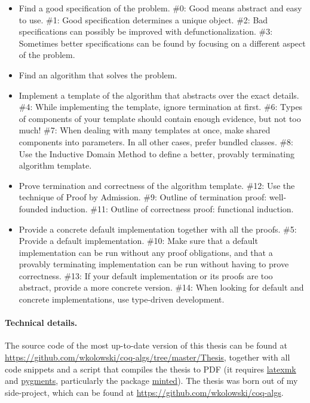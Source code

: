 \documentclass[declaration,mgr,english,shortabstract]{iithesis}
\newcommand{\repo}{\url{https://github.com/wkolowski/coq-algs}}
\newcommand{\thesisrepo}{\url{https://github.com/wkolowski/coq-algs/tree/master/Thesis}}
\begin{document}
\begin{itemize}
    \item Find a good specification of the problem.
    \subitem \#0: Good means abstract and easy to use.
    \subitem \#1: Good specification determines a unique object.
    \subitem \#2: Bad specifications can possibly be improved with defunctionalization.
    \subitem \#3: Sometimes better specifications can be found by focusing on a different aspect of the problem.
    \item Find an algorithm that solves the problem.
    \item Implement a template of the algorithm that abstracts over the exact details.
    \subitem \#4: While implementing the template, ignore termination at first.
    \subitem \#6: Types of components of your template should contain enough evidence, but not too much!
    \subitem \#7: When dealing with many templates at once, make shared components into parameters. In all other cases, prefer bundled classes.
    \subitem \#8: Use the Inductive Domain Method to define a better, provably terminating algorithm template.
    \item Prove termination and correctness of the algorithm template.
    \subitem \#12: Use the technique of Proof by Admission.
    \subitem \#9: Outline of termination proof: well-founded induction.
    \subitem \#11: Outline of correctness proof: functional induction.
    \item Provide a concrete default implementation together with all the proofs.
    \subitem \#5: Provide a default implementation.
    \subitem \#10: Make sure that a default implementation can be run without any proof obligations, and that a provably terminating implementation can be run without having to prove correctness.
    \subitem \#13: If your default implementation or its proofs are too abstract, provide a more concrete version.
    \subitem \#14: When looking for default and concrete implementations, use type-driven development.
\end{itemize}

\paragraph{Technical details.}{The source code of the most up-to-date version of this thesis can be found at \thesisrepo, together with all code snippets and a script that compiles the thesis to PDF (it requires \href{https://mg.readthedocs.io/latexmk.html}{latexmk} and \href{https://pygments.org/}{pygments}, particularly the package \href{http://tug.ctan.org/tex-archive/macros/latex/contrib/minted/minted.pdf}{minted}). The thesis was born out of my side-project, which can be found at \repo.}
\end{document}

